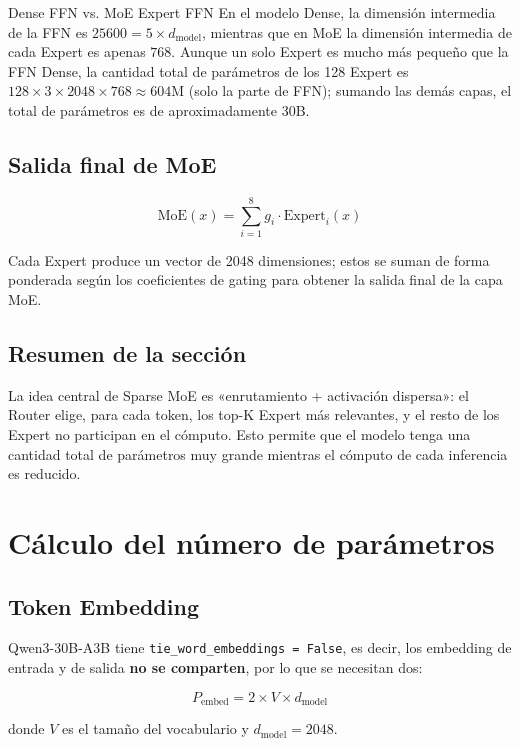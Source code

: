 \documentclass[a4paper]{article}
\begin{document}
\begin{knowledgebox}{Dense FFN vs. MoE Expert FFN}
En el modelo Dense, la dimensión intermedia de la FFN es $25600 = 5 \times d_{\text{model}}$, mientras que en MoE la dimensión intermedia de cada Expert es apenas $768$. Aunque un solo Expert es mucho más pequeño que la FFN Dense, la cantidad total de parámetros de los 128 Expert es $128 \times 3 \times 2048 \times 768 \approx 604\text{M}$ (solo la parte de FFN); sumando las demás capas, el total de parámetros es de aproximadamente 30B.
\end{knowledgebox}

\subsection{Salida final de MoE}

$$
\text{MoE}(x) = \sum_{i=1}^{8} g_i \cdot \text{Expert}_i(x)
$$

Cada Expert produce un vector de 2048 dimensiones; estos se suman de forma ponderada según los coeficientes de gating para obtener la salida final de la capa MoE.

\subsection{Resumen de la sección}

La idea central de Sparse MoE es «enrutamiento + activación dispersa»: el Router elige, para cada token, los top-K Expert más relevantes, y el resto de los Expert no participan en el cómputo. Esto permite que el modelo tenga una cantidad total de parámetros muy grande mientras el cómputo de cada inferencia es reducido.
\section{Cálculo del número de parámetros}

\subsection{Token Embedding}

Qwen3-30B-A3B tiene \texttt{tie\_word\_embeddings = False}, es decir, los embedding de entrada y de salida \textbf{no se comparten}, por lo que se necesitan dos:

$$
P_{\text{embed}} = 2 \times V \times d_{\text{model}}
$$

donde $V$ es el tamaño del vocabulario y $d_{\text{model}} = 2048$.
\end{document}
